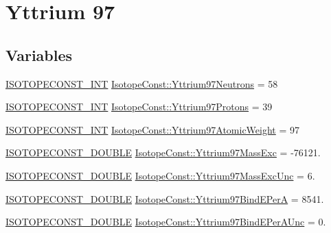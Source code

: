 \hypertarget{group___isotope_const-_yttrium-_y97}{}\section{Yttrium 97}
\label{group___isotope_const-_yttrium-_y97}
\subsection*{Variables}
\begin{DoxyCompactItemize}
\item 
\mbox{\hyperlink{group___isotope_const-_macros_ga5f18360b3e99483a35c32d789e62621c}{I\+S\+O\+T\+O\+P\+E\+C\+O\+N\+S\+T\+\_\+\+I\+NT}} \mbox{\hyperlink{group___isotope_const-_yttrium-_y97_ga536020c2a4a422495e4e932c0f5d162e}{Isotope\+Const\+::\+Yttrium97\+Neutrons}} = 58
\item 
\mbox{\hyperlink{group___isotope_const-_macros_ga5f18360b3e99483a35c32d789e62621c}{I\+S\+O\+T\+O\+P\+E\+C\+O\+N\+S\+T\+\_\+\+I\+NT}} \mbox{\hyperlink{group___isotope_const-_yttrium-_y97_ga171f0d1a99024ed59a97bf81a796c04e}{Isotope\+Const\+::\+Yttrium97\+Protons}} = 39
\item 
\mbox{\hyperlink{group___isotope_const-_macros_ga5f18360b3e99483a35c32d789e62621c}{I\+S\+O\+T\+O\+P\+E\+C\+O\+N\+S\+T\+\_\+\+I\+NT}} \mbox{\hyperlink{group___isotope_const-_yttrium-_y97_ga0e69c3eb4c0c42708bc4d12d6b08b4b2}{Isotope\+Const\+::\+Yttrium97\+Atomic\+Weight}} = 97
\item 
\mbox{\hyperlink{group___isotope_const-_macros_ga8f45a7272ce02c0b4c65c44636ed719a}{I\+S\+O\+T\+O\+P\+E\+C\+O\+N\+S\+T\+\_\+\+D\+O\+U\+B\+LE}} \mbox{\hyperlink{group___isotope_const-_yttrium-_y97_ga45e382c75d9caaa1ed996a1f783e70ad}{Isotope\+Const\+::\+Yttrium97\+Mass\+Exc}} = -\/76121.
\item 
\mbox{\hyperlink{group___isotope_const-_macros_ga8f45a7272ce02c0b4c65c44636ed719a}{I\+S\+O\+T\+O\+P\+E\+C\+O\+N\+S\+T\+\_\+\+D\+O\+U\+B\+LE}} \mbox{\hyperlink{group___isotope_const-_yttrium-_y97_gabd1a47ac7f004852674e54f22a1ecd3e}{Isotope\+Const\+::\+Yttrium97\+Mass\+Exc\+Unc}} = 6.
\item 
\mbox{\hyperlink{group___isotope_const-_macros_ga8f45a7272ce02c0b4c65c44636ed719a}{I\+S\+O\+T\+O\+P\+E\+C\+O\+N\+S\+T\+\_\+\+D\+O\+U\+B\+LE}} \mbox{\hyperlink{group___isotope_const-_yttrium-_y97_ga2742629797feaf9884694cbbc0b0c9c5}{Isotope\+Const\+::\+Yttrium97\+Bind\+E\+PerA}} = 8541.
\item 
\mbox{\hyperlink{group___isotope_const-_macros_ga8f45a7272ce02c0b4c65c44636ed719a}{I\+S\+O\+T\+O\+P\+E\+C\+O\+N\+S\+T\+\_\+\+D\+O\+U\+B\+LE}} \mbox{\hyperlink{group___isotope_const-_yttrium-_y97_gaf18d0558c39f03452ad35c72c9dfee41}{Isotope\+Const\+::\+Yttrium97\+Bind\+E\+Per\+A\+Unc}} = 0.

\end{DoxyCompactItemize}
